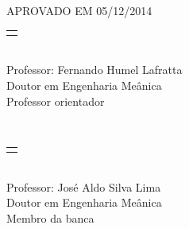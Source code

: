 \documentclass[12pt]{article}
\begin{document}
\onehalfspacing


\begin{center}
{
	{
		APROVADO EM 05/12/2014
	}\\[5cm]
	
	{	
		\begin{tabular}[t]{@{}l@{}}
			\makebox[8cm]{\dotfill}\\
		\end{tabular} \\
		Professor: Fernando Humel Lafratta \\
		Doutor em Engenharia Meânica \\
		Professor orientador
	}\\[5cm]
	
	\begin{tabular}[t]{@{}l@{}}
		\makebox[8cm]{\dotfill}\\
	\end{tabular} \\
	Professor: José Aldo Silva Lima \\
	Doutor em Engenharia Meânica \\
	Membro da banca \\
}
\end{center}
\pagebreak







\tableofcontents
\pagebreak

\listoffigures
\pagebreak
\end{document}
